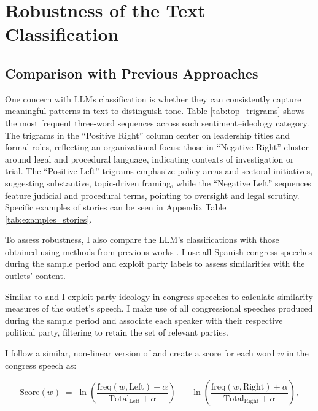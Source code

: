 \documentclass[12pt]{article}
\begin{document}
\section{Robustness of the Text Classification}

\label{sec:robustness}







\subsection{Comparison with Previous Approaches}


One concern with LLMs classification is whether they can consistently capture meaningful patterns in text to distinguish tone. Table \ref{tab:top_trigrams} shows the most frequent three-word sequences across each sentiment–ideology category. The trigrams in the “Positive Right” column center on leadership titles and formal roles, reflecting an organizational focus; those in “Negative Right” cluster around legal and procedural language, indicating contexts of investigation or trial. The “Positive Left” trigrams emphasize policy areas and sectoral initiatives, suggesting substantive, topic-driven framing, while the “Negative Left” sequences feature judicial and procedural terms, pointing to oversight and legal scrutiny. Specific examples of stories can be seen in Appendix Table \ref{tab:examples_stories}.


To assess robustness, I also compare the LLM’s classifications with those obtained using methods from previous works \citep{gentzkow2010media,laver2003extracting}. I use all Spanish congress speeches during the sample period and exploit party labels to assess similarities with the outlets’ content. 


Similar to \cite{gentzkow2010media} and \cite{laver2003extracting} I exploit party ideology in congress speeches to calculate similarity measures of the outlet's speech. I make use of all congressional speeches produced during the sample period and associate each speaker with their respective political party, filtering to retain the set of relevant parties.

I follow a similar, non-linear version of \cite{laver2003extracting} and create a score for each word $w$ in the congress speech as: 



\begin{equation}
	\text{Score}(w) \;=\; \ln \left( \frac{\mathrm{freq}(w,\text{Left}) + \alpha}{\mathrm{Total}_{\text{Left}} + \alpha} \right) \;-\; \ln \left( \frac{\mathrm{freq}(w,\text{Right}) + \alpha}{\mathrm{Total}_{\text{Right}} + \alpha} \right),
	\label{eq:log_ratio}
\end{equation}
\end{document}
